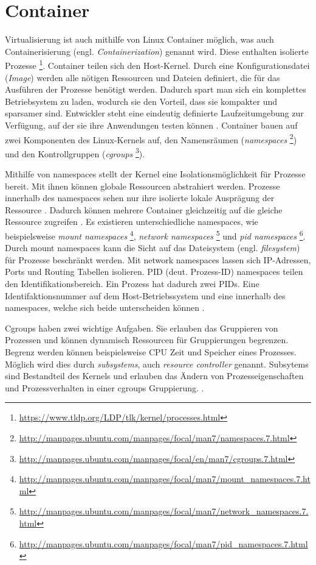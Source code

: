 \section{Container}
Virtualisierung ist auch mithilfe von Linux Container möglich,
was auch Containerisierung (engl. \textit{Containerization})
genannt wird. Diese enthalten isolierte Prozesse
\footnote{\url{https://www.tldp.org/LDP/tlk/kernel/processes.html}}.
Container teilen sich den Host-Kernel. Durch eine
Konfigurationsdatei (\textit{Image}) werden alle
nötigen Ressourcen und Dateien definiert, die für das Ausführen
der Prozesse benötigt werden. Dadurch spart man sich ein komplettes
Betriebsystem zu laden, wodurch sie den Vorteil,
dass sie kompakter und sparsamer sind. Entwickler steht eine eindeutig
definierte Laufzeitumgebung zur Verfügung, auf der sie ihre Anwendungen testen
können \cite{RedHatContainer}. Container bauen auf zwei Komponenten
des Linux-Kernels auf, den Namensräumen
(\textit{namespaces} \footnote{\url{http://manpages.ubuntu.com/manpages/focal/man7/namespaces.7.html}})
und den Kontrollgruppen
(\textit{cgroups} \footnote{\url{http://manpages.ubuntu.com/manpages/focal/en/man7/cgroups.7.html}}).

Mithilfe von namespaces stellt der Kernel eine Isolationsmöglichkeit
für Prozesse bereit. Mit ihnen können globale Ressourcen abstrahiert werden.
Prozesse innerhalb des namespaces sehen nur ihre isolierte lokale
Ausprägung der Ressource \cite{UbuntuNamespaces}.
Dadurch können mehrere Container gleichzeitig auf die gleiche
Ressource zugreifen \cite{RedHatIntroToLinuxContainers}.
Es existieren unterschiedliche namespaces, wie beispielsweise
\textit{mount namespaces} \footnote{\url{http://manpages.ubuntu.com/manpages/focal/man7/mount_namespaces.7.html}},
\textit{network namespaces} \footnote{\url{http://manpages.ubuntu.com/manpages/focal/man7/network_namespaces.7.html}}
und \textit{pid namespaces} \footnote{\url{http://manpages.ubuntu.com/manpages/focal/man7/pid_namespaces.7.html}}.
Durch mount namespaces kann die Sicht auf das Dateisystem
(engl. \textit{filesystem}) für Prozesse beschränkt werden.
Mit network namespaces lassen sich IP-Adressen, Ports
und Routing Tabellen isolieren. PID (deut. Prozess-ID) namespaces teilen
den Identifikationsbereich. Ein Prozess hat dadurch zwei
PIDs. Eine Identifaktionsnummer auf dem Host-Betriebssystem und eine
innerhalb des namespaces, welche sich beide unterscheiden können
\cite{LwnDotNetNamespaces}.

Cgroups haben zwei wichtige Aufgaben. Sie erlauben das Gruppieren
von Prozessen und können dynamisch Ressourcen für Gruppierungen begrenzen.
Begrenz werden können beispielsweise CPU Zeit und Speicher eines Prozesses.
Möglich wird dies durch \textit{subsystems},
auch \textit{resource controller} genannt. Subsytems sind Bestandteil
des Kernels und erlauben das Ändern von Prozesseigenschaften und
Prozessverhalten in einer cgroups Gruppierung. 
\cite{RedHatIntroToLinuxContainers}.



